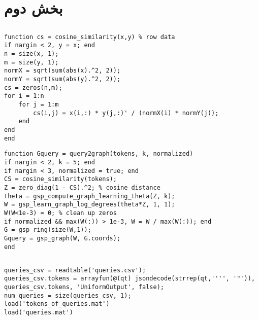 \subsection{}%

\subsection{}%

\subsection{}%

\section{بخش دوم}


\subsection{} %

\begin{latin}
\begin{lstlisting}
function cs = cosine_similarity(x,y) % row data
if nargin < 2, y = x; end
n = size(x, 1);
m = size(y, 1);
normX = sqrt(sum(abs(x).^2, 2));
normY = sqrt(sum(abs(y).^2, 2));
cs = zeros(n,m);
for i = 1:n
	for j = 1:m
		cs(i,j) = x(i,:) * y(j,:)' / (normX(i) * normY(j));
	end
end
end
\end{lstlisting}
\end{latin}


\begin{latin}
\begin{lstlisting}
function Gquery = query2graph(tokens, k, normalized)
if nargin < 2, k = 5; end
if nargin < 3, normalized = true; end
CS = cosine_similarity(tokens);
Z = zero_diag(1 - CS).^2; % cosine distance
theta = gsp_compute_graph_learning_theta(Z, k);
W = gsp_learn_graph_log_degrees(theta*Z, 1, 1);
W(W<1e-3) = 0; % clean up zeros
if normalized && max(W(:)) > 1e-3, W = W / max(W(:)); end
G = gsp_ring(size(W,1));
Gquery = gsp_graph(W, G.coords);
end
\end{lstlisting}
\end{latin}



\subsection{} %

\begin{latin}
\begin{lstlisting}
queries_csv = readtable('queries.csv');
queries_csv.tokens = arrayfun(@(qt) jsondecode(strrep(qt,'''', '"')), queries_csv.tokens, 'UniformOutput', false);
num_queries = size(queries_csv, 1);
load('tokens_of_queries.mat')
load('queries.mat')
\end{lstlisting}
\end{latin}

